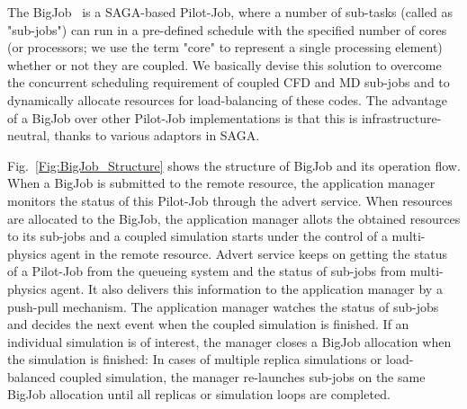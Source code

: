 \documentclass[preprint,12pt]{elsarticle}
\newcommand{\skonote}[1]{ {\textcolor{green} { ***Jeff: #1 }}}
\newcommand{\skonote}[1]{}
\begin{document}


The BigJob~\cite{saga_royalsoc} is a SAGA-based Pilot-Job, where a number of sub-tasks 
(called as "sub-jobs") can run in a pre-defined schedule with 
the specified number of cores (or processors; we use the term 
"core" to represent a single processing element) whether or not they are coupled. 
We basically devise this solution to overcome the concurrent scheduling requirement of 
coupled CFD and MD sub-jobs and to dynamically allocate resources for load-balancing of 
these codes. The advantage of a BigJob over other Pilot-Job implementations is that 
this is infrastructure-neutral, thanks to various adaptors in SAGA.


Fig.~\ref{Fig:BigJob_Structure} shows the structure of BigJob and its operation flow. When a BigJob is submitted to the remote resource, the application manager monitors the status of this Pilot-Job through the advert service. When resources are allocated to the BigJob, the application manager allots the obtained resources to its sub-jobs and a coupled simulation starts under the control of a multi-physics agent in the remote resource. Advert service keeps on getting the status of a Pilot-Job from the queueing system and the status of sub-jobs from multi-physics agent. It also delivers this information to the application manager by a push-pull mechanism. The application manager watches the status of sub-jobs and decides the next event when the coupled simulation is finished. If an individual simulation is of interest, the manager closes a BigJob allocation when the simulation is finished: In cases of multiple replica simulations or load-balanced coupled simulation, the manager re-launches sub-jobs on the same BigJob allocation until all replicas or simulation loops are completed.
\end{document}
